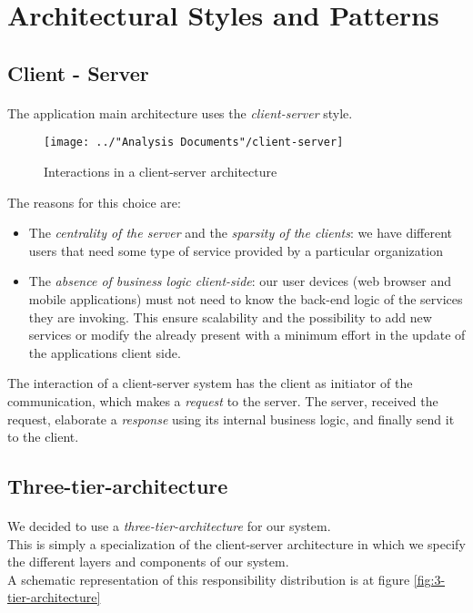 \section{Architectural Styles and Patterns}

\subsection{Client - Server}
\paragraph{}The application main architecture uses the \textit{client-server} style.
\begin{figure}[H]
	\centering
	\texttt{[image: ../"Analysis Documents"/client-server]}
	\caption{Interactions in a client-server architecture}
\end{figure}
The reasons for this choice are:
\begin{itemize}
	\item The \textit{centrality of the server} and the \textit{sparsity of the clients}: we have different users that need some type of service provided by a particular organization
	\item The \textit{absence of business logic client-side}: our user devices (web browser and mobile applications) must not need to know the back-end logic of the services they are invoking. This ensure scalability and the possibility to add new services or modify the already present with a minimum effort in the update of the applications client side.
\end{itemize}
The interaction of a client-server system has the client as initiator of the communication, which makes a \textit{request} to the server. The server, received the request, elaborate a \textit{response} using its internal business logic, and finally send it to the client.
\subsection{Three-tier-architecture}
\paragraph{} We decided to use a \textit{three-tier-architecture} for our system.\\
This is simply a specialization of the client-server architecture in which we specify the different layers and components of our system.\\
A schematic representation of this responsibility distribution is at figure \ref{fig:3-tier-architecture}

